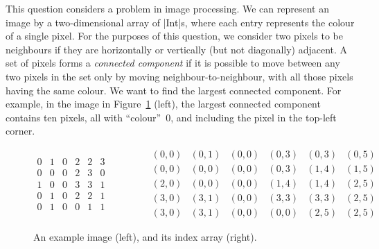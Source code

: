 \begin{question}
This question considers a problem in image processing.  We can represent an
image by a two-dimensional array of |Int|s, where each entry represents the
colour of a single pixel.  For the purposes of this question, we consider two
pixels to be neighbours if they are horizontally or vertically (but not
diagonally) adjacent.  A set of pixels forms a \emph{connected component} if
it is possible to move between any two pixels in the set only by moving
neighbour-to-neighbour, with all those pixels having the same colour.  We want
to find the largest connected component.
For example, in the image in Figure~\ref{fig:image} (left), the largest
connected component contains ten pixels, all with ``colour''~0, and including
the pixel in the top-left corner.


\begin{figure}[h]
\[
\begin{array}{cccccc}
0 & 1 & 0 & 2 & 2 & 3 \\
0 & 0 & 0 & 2 & 3 & 0 \\
1 & 0 & 0 & 3 & 3 & 1 \\
0 & 1 & 0 & 2 & 2 & 1 \\
0 & 1 & 0 & 0 & 1 & 1
\end{array}
\qquad\qquad
\begin{array}{cccccc}
(0,0) & (0,1) & (0,0) & (0,3) & (0,3) & (0,5) \\
(0,0) & (0,0) & (0,0) & (0,3) & (1,4) & (1,5) \\
(2,0) & (0,0) & (0,0) & (1,4) & (1,4) & (2,5) \\
(3,0) & (3,1) & (0,0) & (3,3) & (3,3) & (2,5) \\
(3,0) & (3,1) & (0,0) & (0,0) & (2,5) & (2,5)
\end{array}
\]
\caption{An example image (left), and its index array (right).}
\label{fig:image}
\end{figure}






\end{question}
